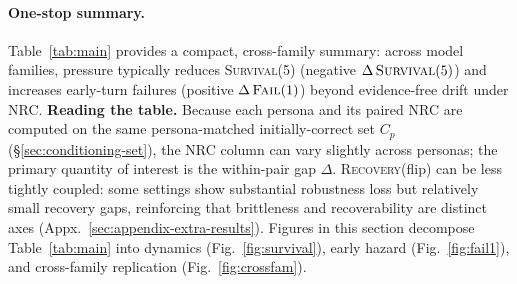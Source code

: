 \documentclass[11pt]{article}
\newcommand{\SurvivalAt}[1]{\textsc{Survival}(#1)}
\newcommand{\FailAt}[1]{\textsc{Fail}(#1)}
\newcommand{\RecoveryAtFlip}{\textsc{Recovery}(flip)}
\newcommand{\NRC}{\textup{\textsc{NRC}}}
\begin{document}
\paragraph{One-stop summary.}
Table~\ref{tab:main} provides a compact, cross-family summary: across model families, pressure typically reduces \SurvivalAt{5} (negative $\Delta\,\SurvivalAt{5}$) and increases early-turn failures (positive $\Delta\,\FailAt{1}$) beyond evidence-free drift under \NRC{}.
\textbf{Reading the table.} Because each persona and its paired \NRC{} are computed on the same persona-matched initially-correct set $C_p$ (\S\ref{sec:conditioning-set}), the \NRC{} column can vary slightly across personas; the primary quantity of interest is the within-pair gap $\Delta$.
\RecoveryAtFlip{} can be less tightly coupled: some settings show substantial robustness loss but relatively small recovery gaps, reinforcing that brittleness and recoverability are distinct axes (Appx.~\ref{sec:appendix-extra-results}).
Figures in this section decompose Table~\ref{tab:main} into dynamics (Fig.~\ref{fig:survival}), early hazard (Fig.~\ref{fig:fail1}), and cross-family replication (Fig.~\ref{fig:crossfam}).
\end{document}
